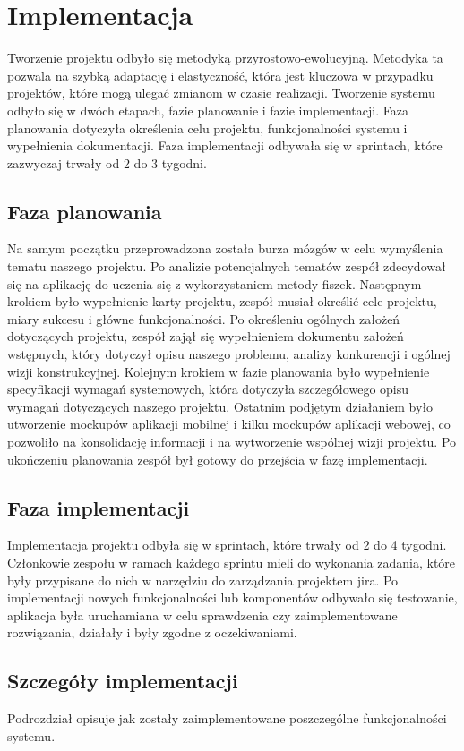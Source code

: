 \chapter{Implementacja}

Tworzenie projektu odbyło się metodyką przyrostowo-ewolucyjną. Metodyka ta pozwala na szybką adaptację i elastyczność, która jest kluczowa w przypadku projektów, które mogą ulegać zmianom w czasie realizacji. Tworzenie systemu odbyło się w dwóch etapach, fazie planowanie i fazie implementacji. Faza planowania dotyczyła określenia celu projektu, funkcjonalności systemu i wypełnienia dokumentacji. Faza implementacji odbywała się w sprintach, które zazwyczaj trwały od 2 do 3 tygodni.

\section{Faza planowania}

Na samym początku przeprowadzona została burza mózgów w celu wymyślenia tematu naszego projektu.\cite{osborn1953} Po analizie potencjalnych tematów zespół zdecydował się na aplikację do uczenia się z wykorzystaniem metody fiszek. Następnym krokiem było wypełnienie karty projektu, zespół musiał określić cele projektu, miary sukcesu i główne funkcjonalności. Po określeniu ogólnych założeń dotyczących projektu, zespół zajął się wypełnieniem dokumentu założeń wstępnych, który dotyczył opisu naszego problemu, analizy konkurencji i ogólnej wizji konstrukcyjnej. Kolejnym krokiem w fazie planowania było wypełnienie specyfikacji wymagań systemowych, która dotyczyła szczegółowego opisu wymagań dotyczących naszego projektu. Ostatnim podjętym działaniem było utworzenie mockupów aplikacji mobilnej i kilku mockupów aplikacji webowej, co pozwoliło na konsolidację informacji i na wytworzenie wspólnej wizji projektu. Po ukończeniu planowania zespół był gotowy do przejścia w fazę implementacji.

\section{Faza implementacji}

Implementacja projektu odbyła się w sprintach, które trwały od 2 do 4 tygodni. Członkowie zespołu w ramach każdego sprintu mieli do wykonania zadania, które były przypisane do nich w narzędziu do zarządzania projektem jira. Po implementacji nowych funkcjonalności lub komponentów odbywało się testowanie, aplikacja była uruchamiana w celu sprawdzenia czy zaimplementowane rozwiązania, działały i były zgodne z oczekiwaniami.



\section{Szczegóły implementacji}

Podrozdział opisuje jak zostały zaimplementowane poszczególne funkcjonalności systemu.















